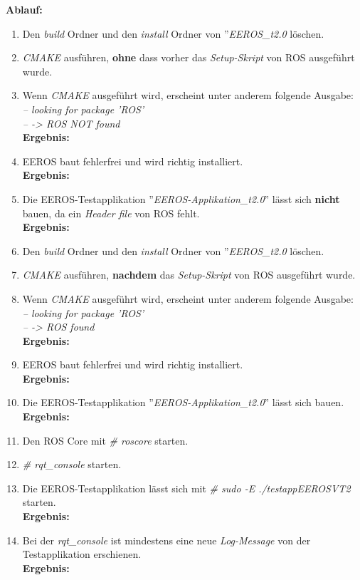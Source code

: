 \textbf{Ablauf: } 
\begin{enumerate}
\item Den \textit{build} Ordner und den \textit{install} Ordner von ''\textit{EEROS\_t2.0} löschen.
\item \textit{CMAKE} ausführen, \textbf{ohne} dass vorher das \textit{Setup-Skript} von ROS ausgeführt wurde.
\item Wenn \textit{CMAKE} ausgeführt wird, erscheint unter anderem folgende Ausgabe: \\
\textit{-- looking for package 'ROS' \\
-- -> ROS NOT found} \\
\textbf{Ergebnis:} \checkmark
\item EEROS baut fehlerfrei und wird richtig installiert. \\
\textbf{Ergebnis:} \checkmark
\item Die EEROS-Testapplikation ''\textit{EEROS-Applikation\_t2.0}'' lässt sich \textbf{nicht} bauen, da ein \textit{Header file} von ROS fehlt. \\
\textbf{Ergebnis:} \checkmark
\item Den \textit{build} Ordner und den \textit{install} Ordner von ''\textit{EEROS\_t2.0} löschen.
\item \textit{CMAKE} ausführen, \textbf{nachdem} das \textit{Setup-Skript} von ROS ausgeführt wurde.
\item Wenn \textit{CMAKE} ausgeführt wird, erscheint unter anderem folgende Ausgabe: \\
\textit{-- looking for package 'ROS' \\
-- -> ROS found} \\
\textbf{Ergebnis:} \checkmark
\item EEROS baut fehlerfrei und wird richtig installiert. \\
\textbf{Ergebnis:} \checkmark
\item Die EEROS-Testapplikation ''\textit{EEROS-Applikation\_t2.0}'' lässt sich bauen. \\
\textbf{Ergebnis:} \checkmark
\item Den ROS Core mit \textit{\# roscore} starten.
\item \textit{\# rqt\_console} starten.
\item Die EEROS-Testapplikation lässt sich mit \textit{\# sudo -E ./testappEEROSVT2 } starten. \\
\textbf{Ergebnis:} \checkmark
\item Bei der \textit{rqt\_console} ist mindestens eine neue \textit{Log-Message} von der Testapplikation erschienen. \\
\textbf{Ergebnis:} \checkmark
\end{enumerate}












